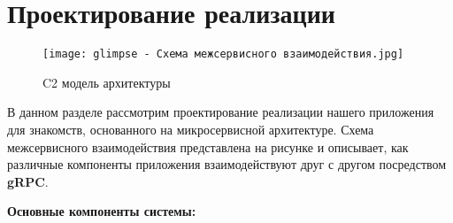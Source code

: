 \section{Проектирование реализации}


\begin{figure}[h]
    \centering
    \texttt{[image: glimpse - Схема межсервисного взаимодействия.jpg]}
    \caption{C2 модель архитектуры}
\end{figure}

В данном разделе рассмотрим проектирование реализации нашего приложения для знакомств, основанного на микросервисной архитектуре. Схема межсервисного взаимодействия представлена на рисунке и описывает, как различные компоненты приложения взаимодействуют друг с другом посредством \textbf{gRPC}.

\textbf{Основные компоненты системы:}

